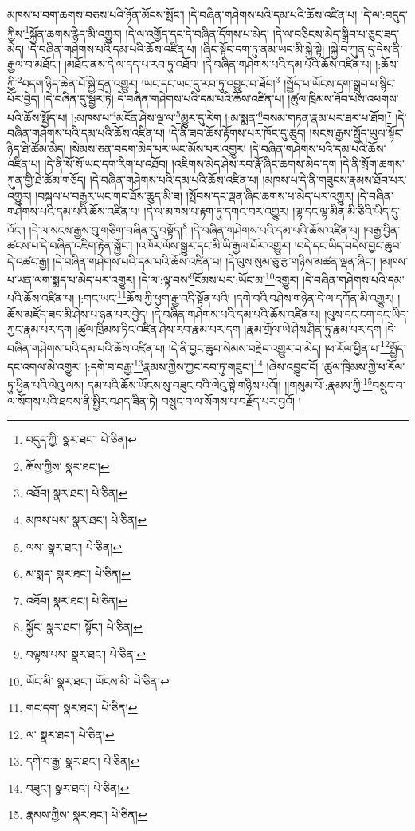 མཁས་པ་བག་ཆགས་བཅས་པའི་ཉོན་མོངས་སྤོང་། །དེ་བཞིན་གཤེགས་པའི་དམ་པའི་ཆོས་འཛིན་པ། །དེ་ལ་:བདུད་ཀྱིས་\footnote{བདུད་ཀྱི་  སྣར་ཐང་།  པེ་ཅིན། }སྐྱོན་ཆགས་རྙེད་མི་འགྱུར། །དེ་ལ་འགྱོད་དང་དེ་བཞིན་དོགས་པ་མེད། །དེ་ལ་བཅིངས་མེད་སྒྲིབ་པ་ཅུང་ཟད་མེད། །དེ་བཞིན་གཤེགས་པའི་དམ་པའི་ཆོས་འཛིན་པ། །ཞིང་སྟོང་དག་ཏུ་ནམ་ཡང་མི་སྐྱེ་སྟེ། །སྐྱེ་བ་ཀུན་དུ་དེས་ནི་རྒྱལ་བ་མཐོང་། །མཐོང་ནས་དེ་ལ་དད་པ་རབ་ཏུ་འཐོབ། །དེ་བཞིན་གཤེགས་པའི་དམ་པའི་ཆོས་འཛིན་པ། །:ཆོས་ཀྱི་\footnote{ཆོས་ཀྱིས་  སྣར་ཐང་། }བདག་ཉིད་ཆེན་པོ་སྐྱེ་དྲན་འགྱུར། །ཡང་དང་ཡང་དུ་རབ་ཏུ་འབྱུང་བ་ཐོབ།\footnote{འཐོབ།  སྣར་ཐང་།  པེ་ཅིན། } །སྤྱོད་པ་ཡོངས་དག་སྒྲུབ་པ་སྙིང་པོར་བྱེད། །དེ་བཞིན་དུ་སྦྱར་ཏེ། དེ་བཞིན་གཤེགས་པའི་དམ་པའི་ཆོས་འཛིན་པ། །ཚུལ་ཁྲིམས་ཐོབ་པས་འཕགས་པའི་ཆོས་སྤྱོད་པ། །:མཁས་པ་\footnote{མཁས་པས་  སྣར་ཐང་།  པེ་ཅིན། }མངོན་ཤེས་ལྔ་ལ་\footnote{ལས་  སྣར་ཐང་།  པེ་ཅིན། }མྱུར་དུ་རེག །:མ་སྨན་\footnote{མ་སྨད་  སྣར་ཐང་།  པེ་ཅིན། }བསམ་གཏན་རྣམ་པར་ཐར་པ་ཐོབ།\footnote{འཐོབ།  སྣར་ཐང་།  པེ་ཅིན། } །དེ་བཞིན་གཤེགས་པའི་དམ་པའི་ཆོས་འཛིན་པ། །དེ་ནི་ཟབ་ཆོས་རྟོགས་པར་ཁོང་དུ་ཆུད། །སངས་རྒྱས་སྤྱོད་ཡུལ་སྟོང་ཉིད་ཐེ་ཚོམ་མེད། །སེམས་ཅན་བདག་མེད་པར་ཡང་མོས་པར་འགྱུར། །དེ་བཞིན་གཤེགས་པའི་དམ་པའི་ཆོས་འཛིན་པ། །དེ་ནི་སོ་སོ་ཡང་དག་རིག་པ་འཐོབ། །འཇིགས་མེད་ཤེས་རབ་རྣོ་ཞིང་ཆགས་མེད་དག །དེ་ནི་སྲོག་ཆགས་ཀུན་གྱི་ཐེ་ཚོམ་གཅོད། །དེ་བཞིན་གཤེགས་པའི་དམ་པའི་ཆོས་འཛིན་པ། །མཁས་པ་དེ་ནི་གཟུངས་རྣམས་ཐོབ་པར་འགྱུར། །བསྐལ་པ་བརྒྱར་ཡང་གང་ཐོས་ཆུད་མི་ཟ། །སྤོབས་དང་ལྡན་ཞིང་ཆགས་པ་མེད་པར་འགྱུར། །དེ་བཞིན་གཤེགས་པའི་དམ་པའི་ཆོས་འཛིན་པ། །དེ་ལ་མཁས་པ་རྟག་ཏུ་དགའ་བར་འགྱུར། །ལྷ་དང་ལྷ་མིན་མི་ཅིའི་ཡིད་དུ་འོང་། །དེ་ལ་སངས་རྒྱས་བུ་གཅིག་བཞིན་དུ་བསྟོད།\footnote{སྐྱོང་  སྣར་ཐང་། སྟོང་།  པེ་ཅིན། } །དེ་བཞིན་གཤེགས་པའི་དམ་པའི་ཆོས་འཛིན་པ། །བརྒྱ་བྱིན་ཚངས་པ་དེ་བཞིན་འཇིག་རྟེན་སྐྱོང་། །འཁོར་ལོས་སྒྱུར་དང་མི་ཡི་རྒྱལ་པོར་འགྱུར། །བདེ་དང་ཡིད་བདེས་བྱང་ཆུབ་དེ་འཚང་རྒྱ། །དེ་བཞིན་གཤེགས་པའི་དམ་པའི་ཆོས་འཛིན་པ། །དེ་ལུས་སུམ་ཅུ་རྩ་གཉིས་མཚན་ལྡན་ཞིང་། །མཁས་པ་ཡན་ལག་སྨད་པ་མེད་པར་འགྱུར། །དེ་ལ་:ལྟ་བས་\footnote{བལྟས་པས་  སྣར་ཐང་།  པེ་ཅིན། }ངོམས་པར་:ཡོང་མ་\footnote{ཡོང་མི་  སྣར་ཐང་། ཡོངས་མི་  པེ་ཅིན། }འགྱུར། །དེ་བཞིན་གཤེགས་པའི་དམ་པའི་ཆོས་འཛིན་པ། །:གང་ཡང་\footnote{གང་དག་  སྣར་ཐང་།  པེ་ཅིན། }ཆོས་ཀྱི་ཕྱག་རྒྱ་འདི་སྟོན་པའི། །དགེ་བའི་བཤེས་གཉེན་དེ་ལ་དཀོན་མི་འགྱུར། །ཆོས་མཛོད་ཟད་མི་ཤེས་པ་ཉན་པར་བྱེད། །དེ་བཞིན་གཤེགས་པའི་དམ་པའི་ཆོས་འཛིན་པ། །ལུས་དང་ངག་དང་ཡིད་ཀྱང་རྣམ་པར་དག །ཚུལ་ཁྲིམས་ཏིང་འཛིན་ཤེས་རབ་རྣམ་པར་དག །རྣམ་གྲོལ་ཡེ་ཤེས་ཤིན་ཏུ་རྣམ་པར་དག །དེ་བཞིན་གཤེགས་པའི་དམ་པའི་ཆོས་འཛིན་པ། །དེ་ནི་བྱང་ཆུབ་སེམས་བརྗེད་འགྱུར་བ་མེད། །ཕ་རོལ་ཕྱིན་པ་\footnote{ལ་  སྣར་ཐང་།  པེ་ཅིན། }སྤྱོད་དང་འགལ་མི་འགྱུར། །:དགེ་བ་བརྒྱ་\footnote{དགེ་བ་རྒྱ་  སྣར་ཐང་།  པེ་ཅིན། }རྣམས་ཀྱིས་ཀྱང་རབ་ཏུ་གཟུང་།\footnote{བཟུང་།  སྣར་ཐང་།  པེ་ཅིན། } །ཞེས་འབྱུང་ངོ། །ཚུལ་ཁྲིམས་ཀྱི་ཕ་རོལ་ཏུ་ཕྱིན་པའི་ལེའུ་ལས། དམ་པའི་ཆོས་ཡོངས་སུ་བཟུང་བའི་ལེའུ་སྟེ་གཉིས་པའོ།། །།གསུམ་པོ་:རྣམས་ཀྱི་\footnote{རྣམས་ཀྱིས་  སྣར་ཐང་།  པེ་ཅིན། }བསྲུང་བ་ལ་སོགས་པའི་ཐབས་ནི་སྤྱིར་བཤད་ཟིན་ཏེ། བསྲུང་བ་ལ་སོགས་པ་བརྗོད་པར་བྱའོ། །
